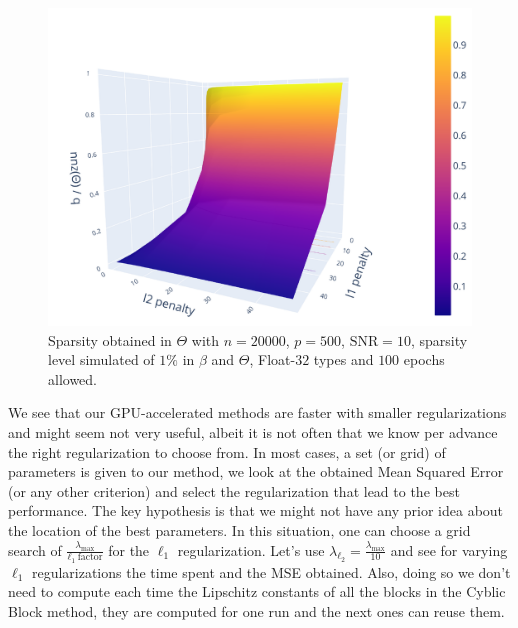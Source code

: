 \documentclass[a4]{article}
\begin{document}
\begin{figure}[ht]
	\centering
	\includegraphics[scale=.4]{prebuilt_images/theta_surface_sparsity.pdf}
	\caption{Sparsity obtained in $\Theta$ with $n=20000$, $p=500$, $\mathrm{SNR}=10$, sparsity level simulated of $1\%$ in $\beta$ and $\Theta$, Float-$32$ types and $100$ epochs allowed.}
	\label{fig:sp_surf}
\end{figure}

We see that our GPU-accelerated methods are faster with smaller regularizations and might seem not very useful, albeit it is not often that we know per advance the right regularization to choose from.
In most cases, a set (or grid) of parameters is given to our method, we look at the obtained Mean Squared Error (or any other criterion) and select the regularization that lead to the best performance.
The key hypothesis is that we might not have any prior idea about the location of the best parameters. In this situation, one can choose a grid search of $\frac{\lambda_{\max}}{\ell_1\ \text{factor}}$ for the $\ell_1$ regularization. Let's use $\lambda_{\ell_2}=\frac{\lambda_{\max}}{10}$ and see for varying $\ell_1$ regularizations the time spent and the MSE obtained.
Also, doing so we don't need to compute each time the Lipschitz constants of all the blocks in the Cyblic Block method, they are computed for one run and the next ones can reuse them.
\end{document}
